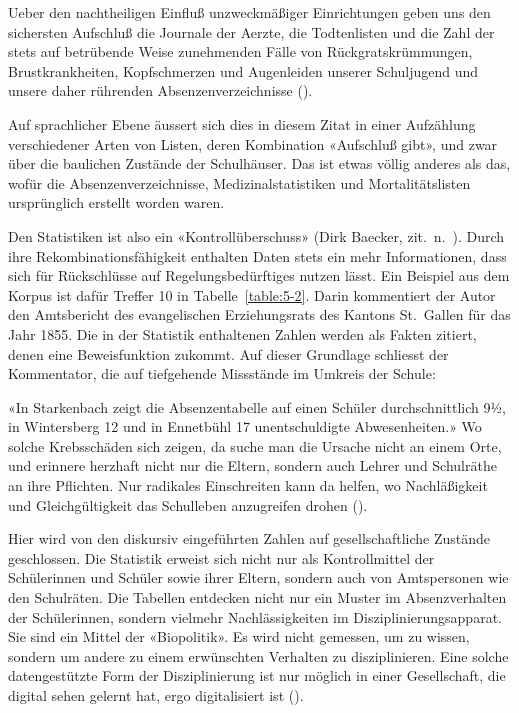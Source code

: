 \begin{displayquote}
    Ueber den nachtheiligen Einfluß unzweckmäßiger Einrichtungen geben uns den sichersten Aufschluß die Journale der Aerzte, die Todtenlisten und die Zahl der stets auf betrübende Weise zunehmenden Fälle von Rückgratskrümmungen, Brustkrankheiten, Kopfschmerzen und Augenleiden unserer Schuljugend und unsere daher rührenden Absenzenverzeichnisse (\cite[70]{j_erste_1865}).
\end{displayquote}

Auf sprachlicher Ebene äussert sich dies in diesem Zitat in einer Aufzählung verschiedener Arten von Listen, deren Kombination «Aufschluß gibt», und zwar über die baulichen Zustände der Schulhäuser. Das ist etwas völlig anderes als das, wofür die Absenzenverzeichnisse, Medizinalstatistiken und Mortalitätslisten ursprünglich erstellt worden waren.

Den Statistiken ist also ein «Kontrollüberschuss» (Dirk Baecker, zit.~n.~\cite[43-44]{nassehi_muster_2019}). Durch ihre Rekombinationsfähigkeit enthalten Daten stets ein mehr Informationen, dass sich für Rückschlüsse auf Regelungsbedürftiges nutzen lässt. Ein Beispiel aus dem Korpus ist dafür Treffer 10 in Tabelle~\ref{table:5-2}. Darin kommentiert der Autor den Amtsbericht des evangelischen Erziehungsrats des Kantons St.~Gallen für das Jahr 1855. Die in der Statistik enthaltenen Zahlen werden als Fakten zitiert, denen eine Beweisfunktion zukommt. Auf dieser Grundlage schliesst der Kommentator, die auf tiefgehende Missstände im Umkreis der Schule:

\begin{displayquote}
    «In Starkenbach zeigt die Absenzentabelle auf einen Schüler durchschnittlich 9½, in Wintersberg 12 und in Ennetbühl 17 unentschuldigte Abwesenheiten.» Wo solche Krebsschäden sich zeigen, da suche man die Ursache nicht an einem Orte, und erinnere herzhaft nicht nur die Eltern, sondern auch Lehrer und Schulräthe an ihre Pflichten. Nur radikales Einschreiten kann da helfen, wo Nachläßigkeit und Gleichgültigkeit das Schulleben anzugreifen drohen (\cite{sch_mittheilungen_1856}).
\end{displayquote}

Hier wird von den diskursiv eingeführten Zahlen auf gesellschaftliche Zustände geschlossen. Die Statistik erweist sich nicht nur als Kontrollmittel der Schülerinnen und Schüler sowie ihrer Eltern, sondern auch von Amtspersonen wie den Schulräten. Die Tabellen entdecken nicht nur ein Muster im Absenzverhalten der Schülerinnen, sondern vielmehr Nachlässigkeiten im Disziplinierungsapparat. Sie sind ein Mittel der «Biopolitik». Es wird nicht gemessen, um zu wissen, sondern um andere zu einem erwünschten Verhalten zu disziplinieren. Eine solche datengestützte Form der Disziplinierung ist nur möglich in einer Gesellschaft, die digital sehen gelernt hat, ergo digitalisiert ist (\cite[309-310]{nassehi_muster_2019}).  


